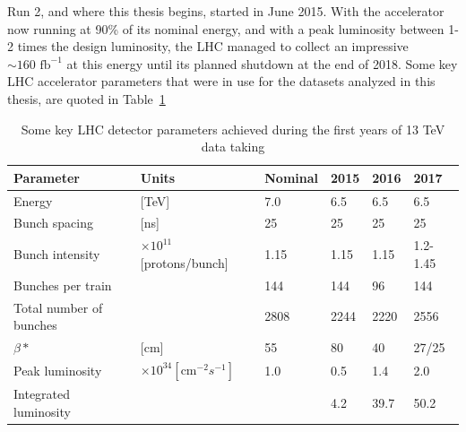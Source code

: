 Run 2, and where this thesis begins, started in June 2015. With the accelerator now running at 90\% of its nominal energy, and with a peak luminosity between 1-2 times the design luminosity, the LHC managed to collect an impressive $\sim 160 \textrm{ fb}^{-1}$ at this energy until its planned shutdown at the end of 2018. Some key LHC accelerator parameters that were in use for the datasets analyzed in this thesis, are quoted in Table~\ref{tab:LHCparameters}

\begin{table}[]
\begin{tabular}{| l | lllll |}
\hline
Parameter               & Units                                      & Nominal & 2015 & 2016 & 2017     \\
\hline
Energy                  & {[}TeV{]}                                  & 7.0     & 6.5  & 6.5  & 6.5      \\
Bunch spacing           & {[}ns{]}                                   & 25      & 25   & 25   & 25       \\
Bunch intensity         & $\times10^{11}${[}protons/bunch{]}         & 1.15    & 1.15 & 1.15 & 1.2-1.45 \\
Bunches per train       &                                            & 144     & 144  & 96   & 144      \\
Total number of bunches &                                            & 2808    & 2244 & 2220 & 2556     \\
$\beta*$                & {[}cm{]}                                   & 55      & 80   & 40   & 27/25    \\
Peak luminosity         & $\times 10^{34} [\textrm{cm}^{-2} s^{-1}]$ & 1.0     & 0.5  & 1.4  & 2.0      \\
Integrated luminosity   &                                            &         & 4.2  & 39.7 & 50.2     \\
\hline
\end{tabular}
\caption{Some key LHC detector parameters achieved during the first years of 13 TeV data taking}
\label{tab:LHCparameters}
\end{table}










